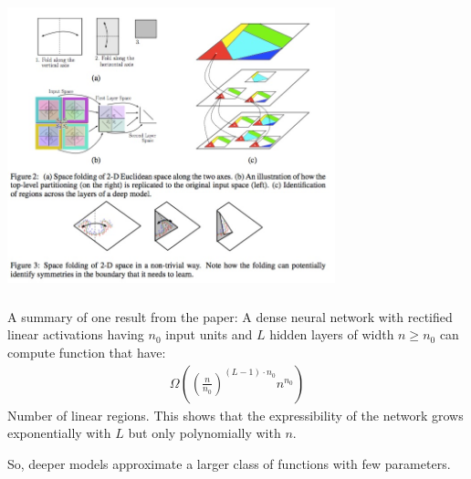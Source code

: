 \documentclass[xetex,mathserif,serif,aspectratio=169]{beamer}
\begin{document}
\begin{frame}[fragile] \frametitle{} \oldB \small

\begin{center}
\includegraphics[height=8cm]{img/linearUnits.jpg}
\end{center}

\end{frame}

\begin{frame}[fragile] \frametitle{} \oldB \small

A summary of one result from the paper: A dense
neural network with rectified linear activations having
$n_0$ input units and $L$ hidden layers of width $n \geq n_0$
can compute function that have:
\begin{align*}
\Omega \left( (\frac{n}{n_0})^{(L-1) \cdot n_0} n^{n_0} \right)
\end{align*}
Number of linear regions. This shows that the expressibility
of the network grows exponentially with $L$ but only polynomially
with $n$.

So, deeper models approximate a larger class of functions with
few parameters.

\end{frame}
\end{document}
